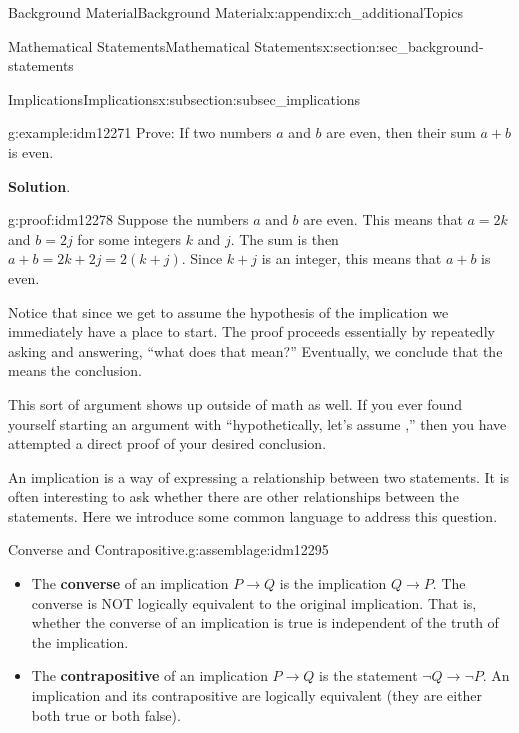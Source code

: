 \documentclass[oneside,10pt,]{book}
\newcommand{\terminology}[1]{\textbf{#1}}
\numberwithin{equation}{chapter}
\def\imp{\rightarrow}
\begin{document}
\begin{appendixptx}{Background Material}{}{Background Material}{}{}{x:appendix:ch_additionalTopics}
\begin{sectionptx}{Mathematical Statements}{}{Mathematical Statements}{}{}{x:section:sec_background-statements}
\begin{subsectionptx}{Implications}{}{Implications}{}{}{x:subsection:subsec_implications}
\begin{example}{}{g:example:idm12271}%
Prove: If two numbers \(a\) and \(b\) are even, then their sum \(a+b\) is even.%
\par\smallskip%
\noindent\textbf{Solution}.\hypertarget{g:solution:idm12277}{}\quad{}\begin{proofptx}{}{g:proof:idm12278}
Suppose the numbers \(a\) and \(b\) are even. This means that  \(a = 2k\) and \(b=2j\) for some integers \(k\) and \(j\). The sum is then \(a+b = 2k+2j = 2(k+j)\). Since \(k+j\) is an integer, this means that \(a+b\) is even.%
\end{proofptx}
Notice that since we get to assume the hypothesis of the implication we immediately have a place to start. The proof proceeds essentially by repeatedly asking and answering, ``what does that mean?''  Eventually, we conclude that the means the conclusion.%
\end{example}
This sort of argument shows up outside of math as well. If you ever found yourself starting an argument with ``hypothetically, let's assume \textellipsis{},'' then you have attempted a direct proof of your desired conclusion.%
\par
An implication is a way of expressing a relationship between two statements.  It is often interesting to ask whether there are other relationships between the statements.  Here we introduce some common language to address this question.%
\begin{assemblage}{Converse and Contrapositive.}{g:assemblage:idm12295}%
%
\begin{itemize}[label=\textbullet]
\item{}The \terminology{converse}  of an implication \(P \imp Q\) is the implication \(Q \imp P\). The converse is NOT logically equivalent to the original implication.  That is, whether the converse of an implication is true is independent of the truth of the implication.%
\item{}The \terminology{contrapositive}  of an implication \(P \imp Q\) is the statement \(\neg Q \imp \neg P\). An implication and its contrapositive are logically equivalent (they are either both true or both false).%
\end{itemize}
%
\end{assemblage}

\end{subsectionptx}
\end{sectionptx}
\end{appendixptx}
\end{document}
